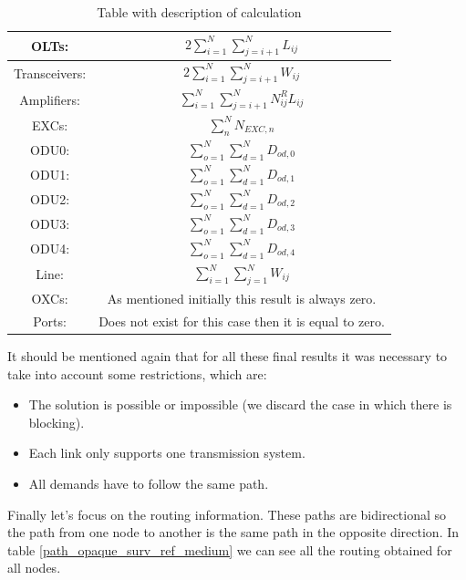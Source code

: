 \begin{table}[h!]
\centering
\begin{tabular}{|| c | c ||}
 \hline
 OLTs: & \(\displaystyle 2 \sum_{i=1}^{N}\sum_{j=i+1}^{N} L_{ij} \) \\ \hline
 Transceivers: & \(\displaystyle 2 \sum_{i=1}^{N}\sum_{j=i+1}^{N} W_{ij} \) \\ \hline
 Amplifiers: & \(\displaystyle \sum_{i=1}^{N}\sum_{j=i+1}^{N} N^R_{ij} L_{ij} \) \\ \hline
 EXCs: & \(\displaystyle \sum_n^N N_{EXC,n} \) \\ \hline
 ODU0: & \(\displaystyle \sum_{o=1}^{N}\sum_{d=1}^{N} D_{od,0} \) \\ \hline
 ODU1: & \(\displaystyle \sum_{o=1}^{N}\sum_{d=1}^{N} D_{od,1} \) \\ \hline
 ODU2: & \(\displaystyle \sum_{o=1}^{N}\sum_{d=1}^{N} D_{od,2} \)\\ \hline
 ODU3: & \(\displaystyle \sum_{o=1}^{N}\sum_{d=1}^{N} D_{od,3} \) \\ \hline
 ODU4: & \(\displaystyle \sum_{o=1}^{N}\sum_{d=1}^{N} D_{od,4} \) \\ \hline
 Line: & \(\displaystyle \sum_{i=1}^{N}\sum_{j=1}^{N} W_{ij} \) \\ \hline
 OXCs: & As mentioned initially this result is always zero. \\ \hline
 Ports: & Does not exist for this case then it is equal to zero. \\
 \hline
 \end{tabular}
\caption{Table with description of calculation}
\label{formulas_opaque_surv_ref_medium}
\end{table}

\vspace{13pt}
It should be mentioned again that for all these final results it was necessary to take into account some restrictions, which are:
\begin{itemize}
  \item The solution is possible or impossible (we discard the case in which there is blocking).
  \item Each link only supports one transmission system.
  \item All demands have to follow the same path.
\end{itemize}

\newpage
Finally let's focus on the routing information. These paths are bidirectional so the path from one node to another is the same path in the opposite direction. In table \ref{path_opaque_surv_ref_medium} we can see all the routing obtained for all nodes.\\

